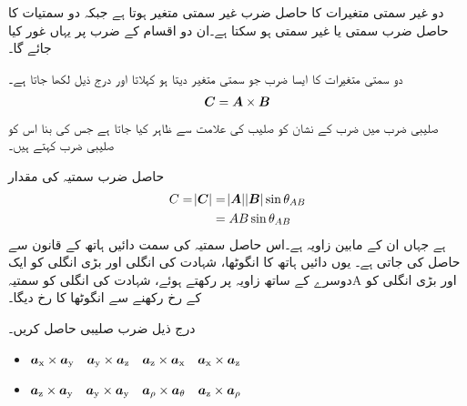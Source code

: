دو غیر سمتی متغیرات کا حاصل ضرب غیر سمتی متغیر ہوتا ہے جبکہ دو سمتیات  کا حاصل ضرب سمتی  یا غیر سمتی ہو سکتا ہے۔ان دو اقسام کے ضرب پر یہاں غور کیا جائے گا۔

دو سمتی متغیرات  کا ایسا ضرب جو سمتی متغیر دیتا ہو   کہلاتا اور درج ذیل لکھا جاتا ہے۔
\begin{align}
{\ensuremath{{\boldsymbol{C}}}}={{\boldsymbol{A}}} \times {\ensuremath{{\boldsymbol{B}}}}
\end{align}
صلیبی ضرب میں ضرب کے نشان کو صلیب کی علامت سے ظاہر کیا جاتا ہے جس کی بنا اس کو صلیبی ضرب کہتے ہیں۔

حاصل ضرب سمتیہ  کی مقدار
\begin{gather}
\begin{aligned}\label{مساوات_بنیادی_ضرب_صلیبی_تعریف}
C=\abs{{{\boldsymbol{C}}}} &= \abs {{{\boldsymbol{A}}}} \abs{{{\boldsymbol{B}}}} \sin \theta_{AB}\\
&=A B \sin \theta_{AB}
\end{aligned}
\end{gather}
ہے جہاں  ان کے مابین زاویہ ہے۔اس حاصل سمتیہ کی سمت دائیں ہاتھ  کے قانون سے  حاصل کی جاتی ہے۔ یوں دائیں ہاتھ کا انگوٹھا، شہادت کی انگلی اور  بڑی انگلی کو ایک دوسرے کے ساتھ  زاویہ پر رکھتے ہوئے، شہادت کی انگلی کو سمتیہ{A} اور بڑی انگلی کو   کے رخ رکھنے سے  انگوٹھا  کا رخ دیگا۔


درج ذیل ضرب صلیبی حاصل کریں۔
\begin{itemize}
\item
${\boldsymbol{a}}_{\textup{x}} \times {\boldsymbol{a}}_{\textup{y}} \quad {\boldsymbol{a}}_{\textup{y}} \times {\boldsymbol{a}}_{\textup{z}} \quad {\boldsymbol{a}}_{\textup{z}} \times {\boldsymbol{a}}_{\textup{x}} \quad {\boldsymbol{a}}_{\textup{x}} \times {\boldsymbol{a}}_{\textup{z}}$ 
\item
 ${\boldsymbol{a}}_{\textup{z}} \times {\boldsymbol{a}}_{\textup{y}} \quad {\boldsymbol{a}}_{\textup{y}} \times {\boldsymbol{a}}_{\textup{y}} \quad {\boldsymbol{a}}_{\rho} \times {\boldsymbol{a}}_{\theta} \quad {\boldsymbol{a}}_{\textup{z}} \times {\boldsymbol{a}}_{\rho}$
\end{itemize}

